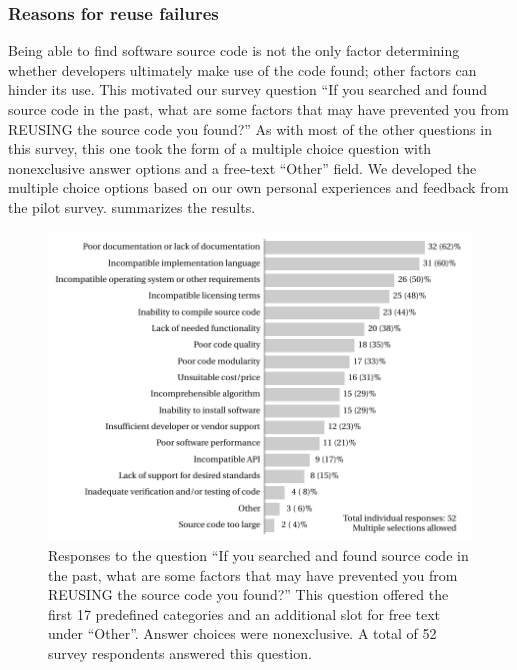 \documentclass{casicswhitepaper}
\begin{document}
\subsubsection{Reasons for reuse failures}
\label{reuse-failures}

Being able to find software source code is not the only factor determining whether developers ultimately make use of the code found; other factors can hinder its use.  This motivated our survey question ``If you searched and found source code in the past, what are some factors that may have prevented you from REUSING the source code you found?''  As with most of the other questions in this survey, this one took the form of a multiple choice question with nonexclusive answer options and a free-text ``Other'' field.  We developed the multiple choice options based on our own personal experiences and feedback from the pilot survey.   summarizes the results.

\begin{figure}[thb]
  \vspace*{-1ex}
  \centering
  \includegraphics[width=5.65in]{files/plots/hindrance-to-reusing-src.pdf}
  \vspace*{-1.5ex}
  \caption{Responses to the question ``If you searched and found source code in the past, what are some factors that may have prevented you from REUSING the source code you found?''  This question offered the first 17 predefined categories and an additional slot for free text under ``Other''.  Answer choices were nonexclusive.  A total of 52 survey respondents answered this question.}
  \label{hindrance-to-reusing-src}
\end{figure}
\end{document}
